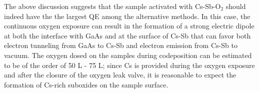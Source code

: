 The above discussion suggests that the sample activated with Cs-Sb-O$_2$ should indeed have the the largest QE among the alternative methods. In this case, the continuous oxygen exposure can result in the formation of a strong electric dipole at both the interface with GaAs and at the surface of Cs-Sb that can favor both electron tunneling from GaAs to Cs-Sb and electron emission from Cs-Sb to vacuum. The oxygen dosed on the samples during codeposition can be estimated to be of the order of 50 L - 75 L; since Cs is provided during the oxygen exposure and after the closure of the oxygen leak valve, it is reasonable to expect the formation of Cs-rich suboxides on the sample surface.




